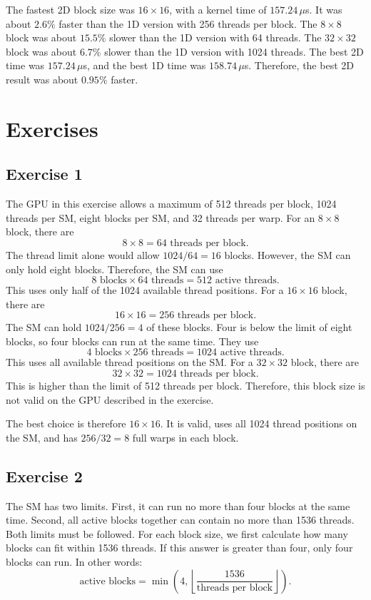 \documentclass{report}
\begin{document}
The fastest 2D block size was $16\times16$, with a kernel time of $157.24\,\mu$s. It was about $2.6\%$ faster than the 1D version with 256 threads per block. The $8\times8$ block was about $15.5\%$ slower than the 1D version with 64 threads. The $32\times32$ block was about $6.7\%$ slower than the 1D version with 1024 threads. The best 2D time was $157.24\,\mu$s, and the best 1D time was $158.74\,\mu$s. Therefore, the best 2D result was about $0.95\%$ faster.

\section{Exercises}
\subsection{Exercise 1}
The GPU in this exercise allows a maximum of 512 threads per block, 1024 threads per SM, eight blocks per SM, and 32 threads per warp.
For an $8\times8$ block, there are
\[
 8\times8=64\text{ threads per block}.
\]
The thread limit alone would allow $1024/64=16$ blocks. However, the SM can only hold eight blocks. Therefore, the SM can use
\[
 8\text{ blocks}\times64\text{ threads}=512\text{ active threads}.
\]
This uses only half of the 1024 available thread positions.
For a $16\times16$ block, there are
\[
 16\times16=256\text{ threads per block}.
\]
The SM can hold $1024/256=4$ of these blocks. Four is below the limit of eight blocks, so four blocks can run at the same time. They use
\[
 4\text{ blocks}\times256\text{ threads}=1024\text{ active threads}.
\]
This uses all available thread positions on the SM.
For a $32\times32$ block, there are
\[
 32\times32=1024\text{ threads per block}.
\]
This is higher than the limit of 512 threads per block. Therefore, this block size is not valid on the GPU described in the exercise.

The best choice is therefore $16\times16$. It is valid, uses all 1024 thread positions on the SM, and has $256/32=8$ full warps in each block.

\subsection{Exercise 2}
The SM has two limits. First, it can run no more than four blocks at the same time. Second, all active blocks together can contain no more than 1536 threads. Both limits must be followed. For each block size, we first calculate how many blocks can fit within 1536 threads. If this answer is greater than four, only four blocks can run. In other words:
\[
 \text{active blocks}
 =\min\left(4,\left\lfloor
 \frac{1536}{\text{threads per block}}
 \right\rfloor\right).
\]
\end{document}
